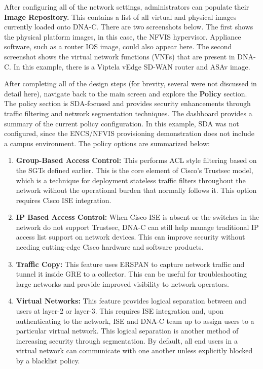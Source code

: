 
After configuring all of the network settings, administrators can populate
their \textbf{Image Repository.} This contains a list of all virtual and physical
images currently loaded onto DNA-C. There are two screenshots below. The first
shows the physical platform images, in this case, the NFVIS hypervisor.
Appliance software, such as a router IOS image, could also appear here. The
second screenshot shows the virtual network functions (VNFs) that are present
in DNA-C. In this example, there is a Viptela vEdge SD-WAN router and ASAv image.



After completing all of the design steps (for brevity, several were not
discussed in detail here), navigate back to the main screen and explore the
\textbf{Policy} section. The policy section is SDA-focused and provides
security enhancements through traffic filtering and network segmentation
techniques. The dashboard provides a summary of the current policy
configuration. In this example, SDA was not configured, since the ENCS/NFVIS
provisioning demonstration does not include a campus environment. The policy
options are summarized below:

\begin{enumerate}
  \item \textbf{Group-Based Access Control:} This performs ACL style filtering based
  on the SGTs defined earlier. This is the core element of Cisco's
  Trustsec model, which is a technique for deployment stateless traffic filters
  throughout the network without the operational burden that normally follows
  it. This option requires Cisco ISE integration.
  \item \textbf{IP Based Access Control:} When Cisco ISE is absent or the switches
  in the network do not support Trustsec, DNA-C can still help manage traditional
  IP access list support on network devices. This can improve security without
  needing cutting-edge Cisco hardware and software products.
  \item \textbf{Traffic Copy:} This feature uses ERSPAN to capture network traffic
  and tunnel it inside GRE to a collector. This can be useful for troubleshooting
  large networks and provide improved visibility to network operators.
  \item \textbf{Virtual Networks:} This feature provides logical separation between
  and users at layer-2 or layer-3. This requires ISE integration and, upon
  authenticating to the network, ISE and DNA-C team up to assign users to a
  particular virtual network. This logical separation is another method of
  increasing security through segmentation. By default, all end users in a
  virtual network can communicate with one another unless explicitly blocked by
  a blacklist policy.
\end{enumerate}

